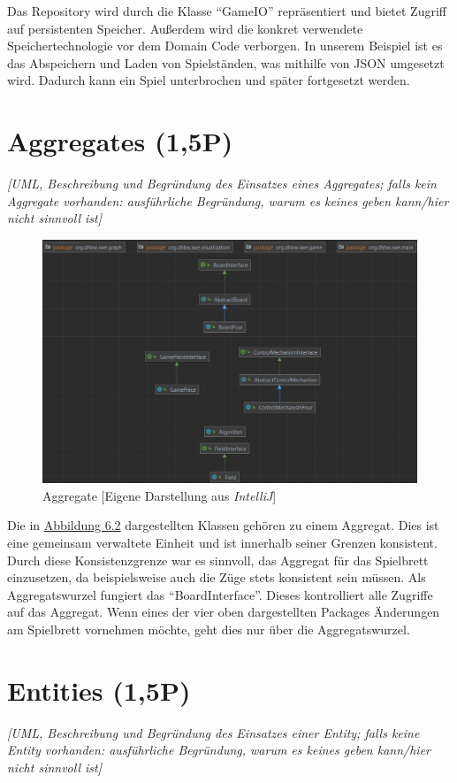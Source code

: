 \noindent Das Repository wird durch die Klasse \enquote{GameIO} repräsentiert und bietet Zugriff auf persistenten Speicher. Außerdem wird die konkret verwendete Speichertechnologie vor dem Domain Code verborgen. In unserem Beispiel ist es das Abspeichern und Laden von Spielständen, was mithilfe von JSON umgesetzt wird. Dadurch kann ein Spiel unterbrochen und später fortgesetzt werden.

\section{Aggregates (1,5P)}
\emph{[UML, Beschreibung und Begründung des Einsatzes eines Aggregates; falls kein Aggregate
vorhanden: ausführliche Begründung, warum es keines geben kann/hier nicht sinnvoll ist]}

\begin{figure}[htbp]
\centering
\centerline{\includegraphics[scale=.6]{aggregat}}
\caption{Aggregate [Eigene Darstellung aus \emph{IntelliJ}]}
\label{fig:aggregat}
\end{figure}

\noindent Die in \hyperref[fig:aggregat]{Abbildung 6.2} dargestellten Klassen gehören zu einem Aggregat. Dies ist eine gemeinsam verwaltete Einheit und ist innerhalb seiner Grenzen konsistent. Durch diese Konsistenzgrenze war es sinnvoll, das Aggregat für das Spielbrett einzusetzen, da beispielsweise auch die Züge stets konsistent sein müssen. Als Aggregatswurzel fungiert das \enquote{BoardInterface}. Dieses kontrolliert alle Zugriffe auf das Aggregat. Wenn eines der vier oben dargestellten Packages Änderungen am Spielbrett vornehmen möchte, geht dies nur über die Aggregatswurzel. 

\section{Entities (1,5P)}
\emph{[UML, Beschreibung und Begründung des Einsatzes einer Entity; falls keine Entity vorhanden:
ausführliche Begründung, warum es keines geben kann/hier nicht sinnvoll ist]}

